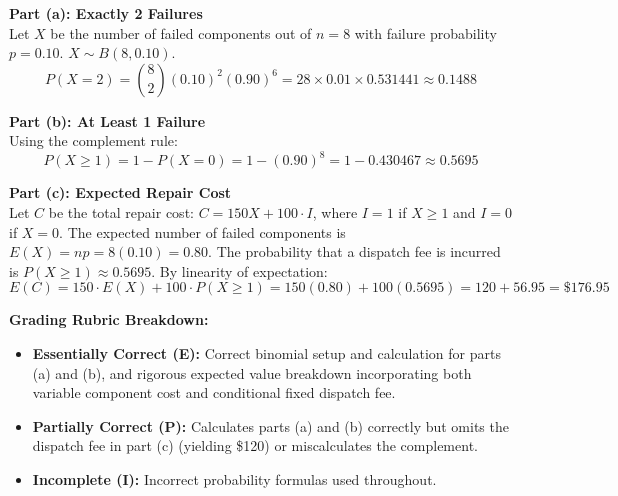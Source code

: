 \begin{frqrubricbox}
\textbf{Part (a): Exactly 2 Failures}\\
Let $X$ be the number of failed components out of $n = 8$ with failure probability $p = 0.10$. $X \sim B(8, 0.10)$.
\[ P(X = 2) = \binom{8}{2} (0.10)^2 (0.90)^6 = 28 \times 0.01 \times 0.531441 \approx 0.1488 \]

\textbf{Part (b): At Least 1 Failure}\\
Using the complement rule:
\[ P(X \ge 1) = 1 - P(X = 0) = 1 - (0.90)^8 = 1 - 0.430467 \approx 0.5695 \]

\textbf{Part (c): Expected Repair Cost}\\
Let $C$ be the total repair cost: $C = 150X + 100 \cdot I$, where $I = 1$ if $X \ge 1$ and $I = 0$ if $X = 0$.
The expected number of failed components is $E(X) = np = 8(0.10) = 0.80$.
The probability that a dispatch fee is incurred is $P(X \ge 1) \approx 0.5695$.
By linearity of expectation:
\[ E(C) = 150 \cdot E(X) + 100 \cdot P(X \ge 1) = 150(0.80) + 100(0.5695) = 120 + 56.95 = \$176.95 \]

\textbf{Grading Rubric Breakdown:}\\
\begin{itemize}
  \item \textbf{Essentially Correct (E):} Correct binomial setup and calculation for parts (a) and (b), and rigorous expected value breakdown incorporating both variable component cost and conditional fixed dispatch fee.
  \item \textbf{Partially Correct (P):} Calculates parts (a) and (b) correctly but omits the dispatch fee in part (c) (yielding \$120) or miscalculates the complement.
  \item \textbf{Incomplete (I):} Incorrect probability formulas used throughout.
\end{itemize}
\end{frqrubricbox}

